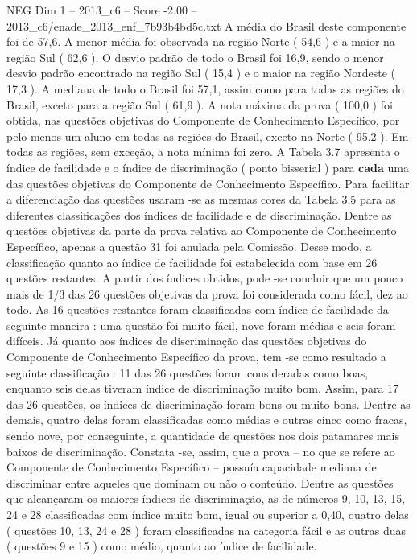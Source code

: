 \begin{textsample}{NEG Dim 1 – 2013\_c6 – Score -2.00 – 2013\_c6/enade\_2013\_enf\_7b93b4bd5c.txt}
A média do Brasil deste componente foi de 57,6.
A menor média foi observada na região Norte ( 54,6 ) e a maior na região Sul ( 62,6 ).
O desvio padrão de todo o Brasil foi 16,9, sendo o menor desvio padrão encontrado na região Sul ( 15,4 ) e o maior na região Nordeste ( 17,3 ).
A mediana de todo o Brasil foi 57,1, assim como para todas as regiões do Brasil, exceto para a região Sul ( 61,9 ).
A nota máxima da prova ( 100,0 ) foi obtida, nas questões objetivas do Componente de Conhecimento Específico, por pelo menos um aluno em todas as regiões do Brasil, exceto na Norte ( 95,2 ).
Em todas as regiões, sem exceção, a nota mínima foi zero.
A Tabela 3.7 apresenta o índice de facilidade e o índice de discriminação ( ponto bisserial ) para \textbf{cada} uma das questões objetivas do Componente de Conhecimento Específico.
Para facilitar a diferenciação das questões usaram -se as mesmas cores da Tabela 3.5 para as diferentes classificações dos índices de facilidade e de discriminação.
Dentre as questões objetivas da parte da prova relativa ao Componente de Conhecimento Específico, apenas a questão 31 foi anulada pela Comissão.
Desse modo, a classificação quanto ao índice de facilidade foi estabelecida com base em 26 questões restantes.
A partir dos índices obtidos, pode -se concluir que um pouco mais de 1/3 das 26 questões objetivas da prova foi considerada como fácil, dez ao todo.
As 16 questões restantes foram classificadas com índice de facilidade da seguinte maneira : uma questão foi muito fácil, nove foram médias e seis foram difíceis.
Já quanto aos índices de discriminação das questões objetivas do Componente de Conhecimento Específico da prova, tem -se como resultado a seguinte classificação : 11 das 26 questões foram consideradas como boas, enquanto seis delas tiveram índice de discriminação muito bom.
Assim, para 17 das 26 questões, os índices de discriminação foram bons ou muito bons.
Dentre as demais, quatro delas foram classificadas como médias e outras cinco como fracas, sendo nove, por conseguinte, a quantidade de questões nos dois patamares mais baixos de discriminação.
Constata -se, assim, que a prova – no que se refere ao Componente de Conhecimento Específico – possuía capacidade mediana de discriminar entre aqueles que dominam ou não o conteúdo.
Dentre as questões que alcançaram os maiores índices de discriminação, as de números 9, 10, 13, 15, 24 e 28 classificadas com índice muito bom, igual ou superior a 0,40, quatro delas ( questões 10, 13, 24 e 28 ) foram classificadas na categoria fácil e as outras duas ( questões 9 e 15 ) como médio, quanto ao índice de facilidade.

\end{textsample}
